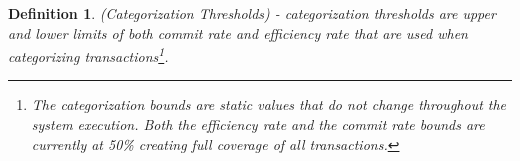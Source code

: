 \documentclass[conference]{IEEEtran}
\newtheorem{definition}{Definition}
\begin{document}
\begin{definition}
\label{cat_bounds}
 (Categorization Thresholds) - categorization thresholds are upper and lower limits of both commit rate and efficiency rate that are used when categorizing transactions\footnote{The categorization bounds are static values that do not change throughout the system execution. Both the efficiency rate and the commit rate bounds are currently at 50\% creating full coverage of all transactions.}.
\end{definition}

\end{document}
